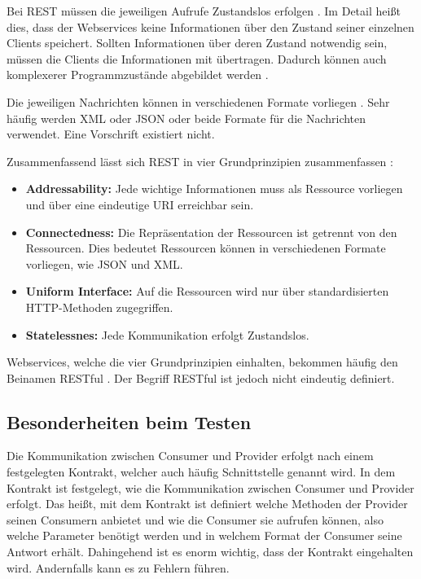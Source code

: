 \documentclass{llncs}
\begin{document}
Bei REST müssen die jeweiligen Aufrufe Zustandslos erfolgen \cite{reza2010framework, porres2011modeling, kao2013performance}. Im Detail heißt dies, dass der Webservices keine Informationen über den Zustand seiner einzelnen Clients speichert. Sollten Informationen über deren Zustand notwendig sein, müssen die Clients die Informationen mit übertragen. Dadurch können auch komplexerer Programmzustände abgebildet werden \cite{porres2011modeling}.

Die jeweiligen Nachrichten können in verschiedenen Formate vorliegen
\cite{reza2010framework}. Sehr häufig werden XML oder JSON oder beide Formate für die Nachrichten verwendet. 
Eine Vorschrift existiert nicht.

Zusammenfassend lässt sich REST in vier Grundprinzipien zusammenfassen \citep{porres2011modeling}: 

\begin{itemize}
\item \textbf{Addressability: } Jede wichtige Informationen muss als Ressource vorliegen und über eine eindeutige URI erreichbar sein.
\item \textbf{Connectedness: } Die Repräsentation der Ressourcen ist getrennt von den Ressourcen. Dies bedeutet Ressourcen können in verschiedenen Formate vorliegen, wie JSON und XML.
\item \textbf{Uniform Interface: } Auf die Ressourcen wird nur über standardisierten HTTP-Methoden zugegriffen.
\item \textbf{Statelessnes: } Jede Kommunikation erfolgt Zustandslos.
\end{itemize}

Webservices, welche die vier Grundprinzipien einhalten, bekommen häufig den Beinamen RESTful \citep{porres2011modeling}. Der Begriff RESTful ist jedoch nicht eindeutig definiert.  

\subsection{Besonderheiten beim Testen}
Die Kommunikation zwischen Consumer und Provider erfolgt nach einem festgelegten Kontrakt, welcher auch häufig Schnittstelle genannt wird. In dem Kontrakt ist festgelegt, wie die Kommunikation zwischen Consumer und Provider erfolgt. Das heißt, mit dem Kontrakt ist definiert welche Methoden der Provider seinen Consumern anbietet und wie die Consumer sie aufrufen können, also welche Parameter benötigt werden und in welchem Format der Consumer seine Antwort erhält. Dahingehend ist es enorm wichtig, dass der Kontrakt eingehalten wird. Andernfalls kann es zu Fehlern führen.
\end{document}

